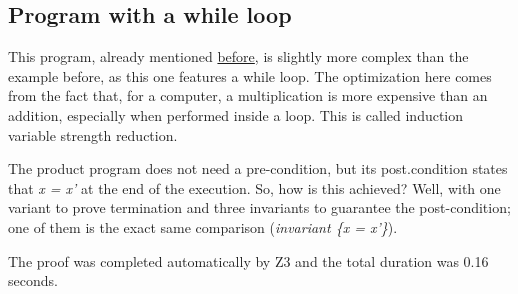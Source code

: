 \subsection{Program with a while loop}
\label{sub:results_while}

This program, already mentioned \hyperref[fig:induction_var_strength_red]{before}, is slightly more complex than the example before, as this one features a while loop.
The optimization here comes from the fact that, for a computer, a multiplication is more expensive than an addition, especially when performed inside a loop.
This is called induction variable strength reduction.

The product program does not need a pre-condition, but its post.condition states that \emph{x = x'} at the end of the execution.
So, how is this achieved?
Well, with one variant to prove termination and three invariants to guarantee the post-condition; one of them is the exact same comparison (\emph{invariant \{x = x'\}}).

The proof was completed automatically by Z3 and the total duration was 0.16 seconds.

